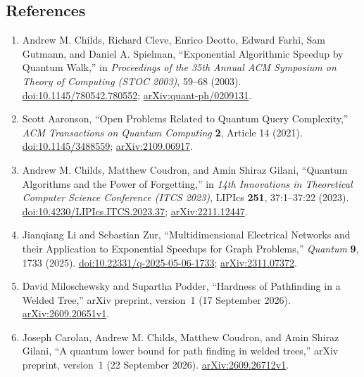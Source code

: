 \subsection*{References}

\begin{enumerate}[label={},leftmargin=4.8em,labelsep=0.5em]
  \footnotesize
  \item[\textup{[CCGS03]}]\label{ref:17bb-childs}
  Andrew M. Childs, Richard Cleve, Enrico Deotto, Edward Farhi, Sam
Gutmann, and Daniel A. Spielman, ``Exponential Algorithmic Speedup by Quantum
Walk,'' in \emph{Proceedings of the 35th Annual ACM Symposium on Theory of
Computing (STOC 2003)}, 59--68 (2003).
\href{https://doi.org/10.1145/780542.780552}{doi:10.1145/780542.780552};
\href{https://arxiv.org/abs/quant-ph/0209131}{arXiv:quant-ph/0209131}.

  \item[\textup{[Aar21]}]\label{ref:17bb-aaronson}
  Scott Aaronson, ``Open Problems Related to Quantum Query Complexity,'' \emph{ACM
Transactions on Quantum Computing} \textbf{2}, Article 14 (2021).
\href{https://doi.org/10.1145/3488559}{doi:10.1145/3488559};
\href{https://arxiv.org/abs/2109.06917}{arXiv:2109.06917}.

  \item[\textup{[CCG23]}]\label{ref:17bb-ccg}
  Andrew M. Childs, Matthew Coudron, and Amin Shiraz Gilani, ``Quantum
Algorithms and the Power of Forgetting,'' in \emph{14th Innovations in
Theoretical Computer Science Conference (ITCS 2023)}, LIPIcs \textbf{251},
37:1--37:22 (2023).
\href{https://doi.org/10.4230/LIPIcs.ITCS.2023.37}{doi:10.4230/LIPIcs.ITCS.2023.37};
\href{https://arxiv.org/abs/2211.12447}{arXiv:2211.12447}.

  \item[\textup{[LZ25]}]\label{ref:17bb-li-zur}
  Jianqiang Li and Sebastian Zur, ``Multidimensional Electrical Networks
and their Application to Exponential Speedups for Graph Problems,'' \emph{Quantum}
\textbf{9}, 1733 (2025).
\href{https://doi.org/10.22331/q-2025-05-06-1733}{doi:10.22331/q-2025-05-06-1733};
\href{https://arxiv.org/abs/2311.07372}{arXiv:2311.07372}.

  \item[\textup{[MP26]}]\label{ref:17bb-miloschewsky-podder}
  David Miloschewsky and Supartha Podder, ``Hardness of Pathfinding in a Welded Tree,'' arXiv preprint, version~1 (17 September 2026). \href{https://arxiv.org/abs/2609.20651v1}{arXiv:2609.20651v1}.

  \item[\textup{[CCCG26]}]\label{ref:17bb-carolan-childs-coudron-gilani}
  Joseph Carolan, Andrew M. Childs, Matthew Coudron, and Amin Shiraz Gilani, ``A quantum lower bound for path finding in welded trees,'' arXiv preprint, version~1 (22 September 2026). \href{https://arxiv.org/abs/2609.26712v1}{arXiv:2609.26712v1}.
\end{enumerate}

